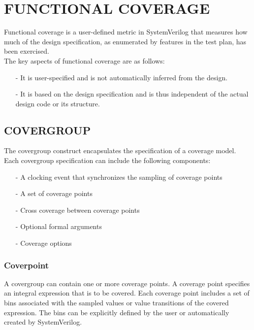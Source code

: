 \section{FUNCTIONAL COVERAGE}
Functional coverage is a user-defined metric in SystemVerilog that measures how much of the design specification, as enumerated by features in the test plan, has been exercised.\\
The key aspects of functional coverage are as follows:
\begin{itemize}
\item[-] It is user-specified and is not automatically inferred from the design.
\item[-] It is based on the design specification and is thus independent of the actual design
code or its structure.
\end{itemize}
\subsection{COVERGROUP}
The covergroup construct encapsulates the specification of a coverage model. Each covergroup specification can include the following components:
\begin{itemize}
\item[-] A clocking event that synchronizes the sampling of coverage points
\item[-] A set of coverage points
\item[-] Cross coverage between coverage points
\item[-] Optional formal arguments
\item[-] Coverage options
\end{itemize}
\subsubsection{Coverpoint}
A covergroup can contain one or more coverage points. A coverage point specifies an integral expression that is to be covered. Each coverage point includes a set of bins associated with the sampled values or value transitions of the covered expression. The bins can be explicitly defined by the user or automatically created by SystemVerilog.
